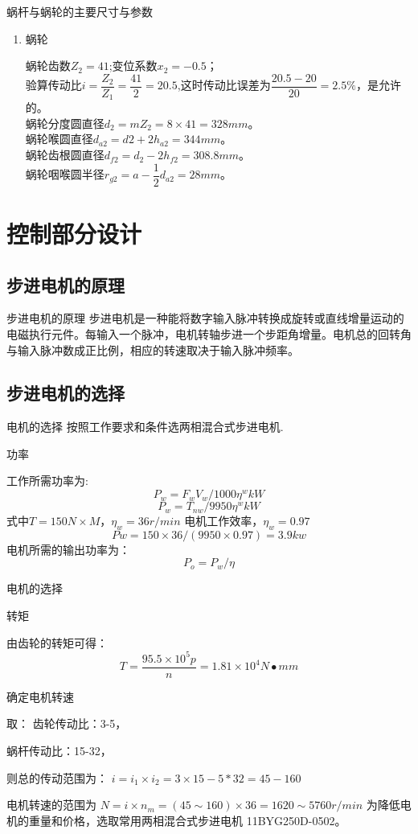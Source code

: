 \documentclass[12pt,xcolor={rgb}]{beamer}
\begin{document}
\begin{frame}{蜗杆与蜗轮的主要尺寸与参数}
	\begin{enumerate}[]
		\item 蜗轮
		
		蜗轮齿数$Z_2=41$;变位系数$x_2=-0.5$；\\
		验算传动比$i=\dfrac{Z_2}{Z_1}=\dfrac{41}{2}=20.5$,这时传动比误差为$\dfrac{20.5-20}{20}=2.5\%$，是允许的。\\
		蜗轮分度圆直径$d_2=mZ_2=8\times 41=328mm$。\\
		蜗轮喉圆直径$d_{a2}=d2+2h_{a2}=344mm$。\\
		蜗轮齿根圆直径$d_{f2}=d_2-2h_{f2}=308.8mm$。\\
		蜗轮咽喉圆半径$r_{g2}=a-\dfrac{1}{2}d_{a2}=28mm$。
		
	\end{enumerate}
\end{frame}


\section{控制部分设计}

\subsection{步进电机的原理}

\begin{frame}{步进电机的原理}
	步进电机是一种能将数字输入脉冲转换成旋转或直线增量运动的电磁执行元件。每输入一个脉冲，电机转轴步进一个步距角增量。电机总的回转角与输入脉冲数成正比例，相应的转速取决于输入脉冲频率。 
\end{frame}

\subsection{步进电机的选择}
\begin{frame}{电机的选择}
	按照工作要求和条件选两相混合式步进电机.
	
	功率
	
	工作所需功率为: $$ P_w = F_w V_w/1000\eta^wkW$$
	$$P_w=T_{nw}/9950\eta^wkW$$
	式中$T=150N\times M$，$\eta_w=36 r/min$ 电机工作效率，$\eta_w=0.97$ 
	$$Pw=150\times 36/(9950\times 0.97 )=3.9kw$$
	电机所需的输出功率为：
	$$P_o=P_w/\eta$$
	
\end{frame}

\begin{frame}{电机的选择}
	
	转矩
	
	由齿轮的转矩可得：$$ T=\dfrac{95.5\times 10^5 p}{n} =1.81 \times 10^4 N\bullet mm$$
	
	确定电机转速
	
	取：
	齿轮传动比：3-5，
	
	蜗杆传动比：15-32，
	
	则总的传动范围为：
	$i=i_1\times i_2 =3\times 15-5*32 =45-160$
	
	电机转速的范围为
	$N=i\times n_m = (45\sim 160)\times 36=1620\sim 5760 r/min$
	为降低电机的重量和价格，选取常用两相混合式步进电机 11BYG250D-0502。
	
\end{frame}
\end{document}
